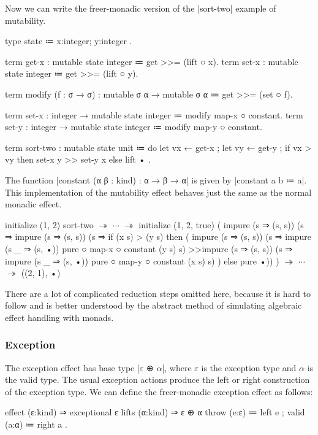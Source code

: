 \newpage
Now we can write the freer-monadic version of the \code|sort-two| example of mutability.
\begin{snippet}
type state ≔ { x:integer; y:integer }.

term get-x : mutable state integer ≔ get >>= (lift ○ x).
term set-x : mutable state integer ≔ get >>= (lift ○ y).

term modify (f : σ → σ) : mutable σ α → mutable σ α
  ≔ get >>= (set ○ f).

term set-x : integer → mutable state integer ≔ modify map-x ○ constant.
term set-y : integer → mutable state integer ≔ modify map-y ○ constant.

term sort-two : mutable state unit
  ≔ do
      { let vx ← get-x
      ; let vy ← get-y
      ; if vx > vy
          then set-x y >> set-y x
          else lift • }.
\end{snippet}
The function \code|constant (α β : kind) : α → β → α| is given by \code|constant a b ≔ a|.
%
This implementation of the mutability effect behaves just the same as the normal monadic effect.
%
\begin{snippet}
initialize (1, 2) sort-two
$↠$ $\cdots$ $↠$
initialize (1, 2, true)
  ( impure (s ⇒ (s, s)) (s ⇒
      impure (s ⇒ (s, s)) (s ⇒
        if (x s) > (y s)
          then
            ( impure (s ⇒ (s, s)) (s ⇒
                impure (s _ ⇒ (s, •)) pure ○ map-x ○ constant (y s) s)
            >>impure (s ⇒ (s, s)) (s ⇒
                impure (s _ ⇒ (s, •)) pure ○ map-y ○ constant (x s) s) )
          else pure •)) )
$↠$ $\cdots$ $↠$
((2, 1), •)
\end{snippet}
%
There are a lot of complicated reduction steps omitted here, because it is hard to follow and is better understood by the abstract method of simulating algebraic effect handling with monads.

\subsubsection{Exception}

The exception effect has base type \code|$ε$ ⊕ $α$|, where $ε$ is the exception type and $α$ is the valid type.
The usual exception actions produce the left or right construction of the exception type.
We can define the freer-monadic exception effect as follows:
\begin{program}
effect (ε:kind) ⇒ exceptional ε
 lifts (α:kind) ⇒ ε ⊕ α
  { throw (e:ε) ≔ left e
  ; valid (a:α) ≔ right a }.
\end{program}

